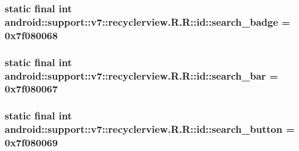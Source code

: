 \hypertarget{classandroid_1_1support_1_1v7_1_1recyclerview_1_1_r_1_1id_1653d2a7bd1ecf9219ead3333872876e}{
\subsubsection[{search\_\-badge}]{\setlength{\rightskip}{0pt plus 5cm}static final int android::support::v7::recyclerview.R.R::id::search\_\-badge = 0x7f080068}}
\label{classandroid_1_1support_1_1v7_1_1recyclerview_1_1_r_1_1id_1653d2a7bd1ecf9219ead3333872876e}


\hypertarget{classandroid_1_1support_1_1v7_1_1recyclerview_1_1_r_1_1id_2907c65ccfd4e1e22912434509bf5680}{
\subsubsection[{search\_\-bar}]{\setlength{\rightskip}{0pt plus 5cm}static final int android::support::v7::recyclerview.R.R::id::search\_\-bar = 0x7f080067}}
\label{classandroid_1_1support_1_1v7_1_1recyclerview_1_1_r_1_1id_2907c65ccfd4e1e22912434509bf5680}


\hypertarget{classandroid_1_1support_1_1v7_1_1recyclerview_1_1_r_1_1id_b9b55e66f297efbd78f2f349f8b9fb26}{
\subsubsection[{search\_\-button}]{\setlength{\rightskip}{0pt plus 5cm}static final int android::support::v7::recyclerview.R.R::id::search\_\-button = 0x7f080069}}
\label{classandroid_1_1support_1_1v7_1_1recyclerview_1_1_r_1_1id_b9b55e66f297efbd78f2f349f8b9fb26}


